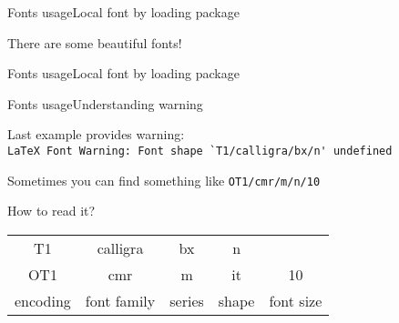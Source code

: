 \begin{frame}[t, fragile]{Fonts usage}{Local font by loading package}\relax

\relax

There are some beautiful fonts!

\end{frame}


\begin{frame}[t, fragile]{Fonts usage}{Local font by loading package}\relax

\relax

\end{frame}


\begin{frame}[fragile]{Fonts usage\premagicPage}{Understanding warning}\relax

Last example provides warning:\\ 
{\csk \verb|LaTeX Font Warning: Font shape `T1/calligra/bx/n' undefined|}

Sometimes you can find something like {\csk\verb|OT1/cmr/m/n/10|}

How to read it?
\strut
\incPause

\centering 
\begin{tabular}{c|c|c|c|c}
T1&calligra&bx&n&\\ 
OT1&cmr&m&it&10\\\hline
\large encoding & font family & series & shape & font size
\end{tabular}
\end{frame}

